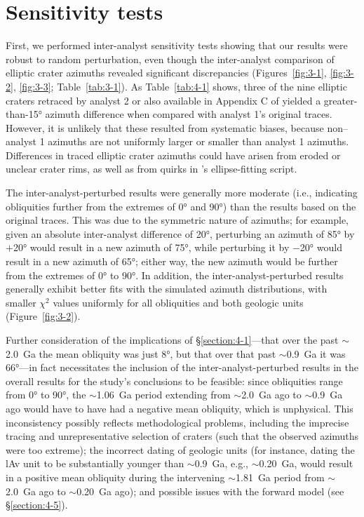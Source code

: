 \documentclass{ucetd}
\begin{document}
\section{Sensitivity tests}
\label{section:4-3}

First, we performed inter-analyst sensitivity tests showing that our results were robust to random perturbation, even though the inter-analyst comparison of elliptic crater azimuths revealed significant discrepancies (Figures~\ref{fig:3-1}, \ref{fig:3-2}, \ref{fig:3-3}; Table~\ref{tab:3-1}). As Table~\ref{tab:4-1} shows, three of the nine elliptic craters retraced by analyst 2 or also available in Appendix C of \citet{holo2018a} yielded a greater-than-15° azimuth difference when compared with analyst 1's original traces. However, it is unlikely that these resulted from systematic biases, because non--analyst 1 azimuths are not uniformly larger or smaller than analyst 1 azimuths. Differences in traced elliptic crater azimuths could have arisen from eroded or unclear crater rims, as well as from quirks in \citet{gal2003a}’s ellipse-fitting script.

The inter-analyst-perturbed results were generally more moderate (i.e., indicating obliquities further from the extremes of 0° and 90°) than the results based on the original traces. This was due to the symmetric nature of azimuths; for example, given an absolute inter-analyst difference of 20°, perturbing an azimuth of 85° by $+$20° would result in a new azimuth of 75°, while perturbing it by $-$20° would result in a new azimuth of 65°; either way, the new azimuth would be further from the extremes of 0° to 90°. In addition, the inter-analyst-perturbed results generally exhibit better fits with the simulated azimuth distributions, with smaller $\chi^2$ values uniformly for all obliquities and both geologic units (Figure~\ref{fig:3-2}).

Further consideration of the implications of §\ref{section:4-1}---that over the past $\sim$2.0~Ga the mean obliquity was just 8°, but that over that past $\sim$0.9~Ga it was 66°---in fact necessitates the inclusion of the inter-analyst-perturbed results in the overall results for the study’s conclusions to be feasible: since obliquities range from 0° to 90°, the $\sim$1.06~Ga period extending from $\sim$2.0~Ga ago to $\sim$0.9~Ga ago would have to have had a negative mean obliquity, which is unphysical. This inconsistency possibly reflects methodological problems, including the imprecise tracing and unrepresentative selection of craters (such that the observed azimuths were too extreme); the incorrect dating of geologic units (for instance, dating the lAv unit to be substantially younger than $\sim$0.9~Ga, e.g., $\sim$0.20~Ga, would result in a positive mean obliquity during the intervening $\sim$1.81~Ga period from $\sim$2.0~Ga ago to $\sim$0.20~Ga ago); and possible issues with the forward model (see §\ref{section:4-5}).
\end{document}
